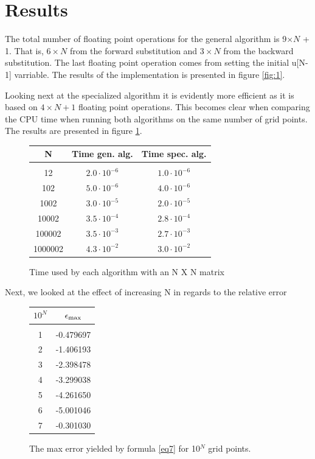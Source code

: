 \documentclass[%
reprint,
amsmath,amssymb,
aps,
]{revtex4-1}
\begin{document}
\section*{Results}
\noindent The total number of floating point operations for the general algorithm is 9$\times N$ + 1. That is, $6\times N$ from the forward substitution and $3\times N $ from the backward substitution. The last floating point operation comes from setting the initial u[N-1] varriable. The results of the implementation is presented in figure \ref{fig:1}.

Looking next at the specialized algorithm it is evidently more efficient as it is based on $4 \times N + 1$ floating point operations. This becomes clear when comparing the CPU time when running both algorithms on the same number of grid points. The results are presented in figure \ref{tab1}.

\begin{figure}[!h]
	\begin{tabular} {|c|c|c|}
		\hline
		N & Time gen. alg. & Time spec. alg.\\
		\hline
		 &  &\\
		12      & $ 2.0 \cdot 10^{-6} $ & $ 1.0 \cdot 10^{-6}$ \\
		102     & $ 5.0 \cdot 10^{-6} $ & $ 4.0 \cdot 10^{-6} $  \\
		1002    & $ 3.0 \cdot 10^{-5} $ & $ 2.0 \cdot 10^{-5} $ \\ 
		10002   & $ 3.5 \cdot 10^{-4} $ & $ 2.8 \cdot 10^{-4}$ \\
		100002  & $ 3.5 \cdot 10^{-3} $ & $ 2.7 \cdot 10^{-3}$  \\
		1000002 & $ 4.3 \cdot 10^{-2} $ & $ 3.0 \cdot 10^{-2}$  \\
		\hline
	\end{tabular}
	\label{tab1}
	\caption{Time used by each algorithm with an N X N matrix}
\end{figure}

Next, we looked at the effect of increasing N in regards to the relative error

\begin{figure}[!h]
	\begin{tabular} {|c|c|}
		\hline
		$10^N$ &  $\epsilon_{\textnormal{max}}$ \\
		\hline
		& \\ 
		1 & -0.479697\\
		2 & -1.406193\\
		3 & -2.398478\\
		4 & -3.299038\\
		5 & -4.261650\\
		6 & -5.001046\\
		7 & -0.301030\\
		\hline
	\end{tabular}
	\label{tab2}
	\caption{The max error yielded by formula \ref{eq7} for 10$^N$ grid points.}
\end{figure}
\end{document}
